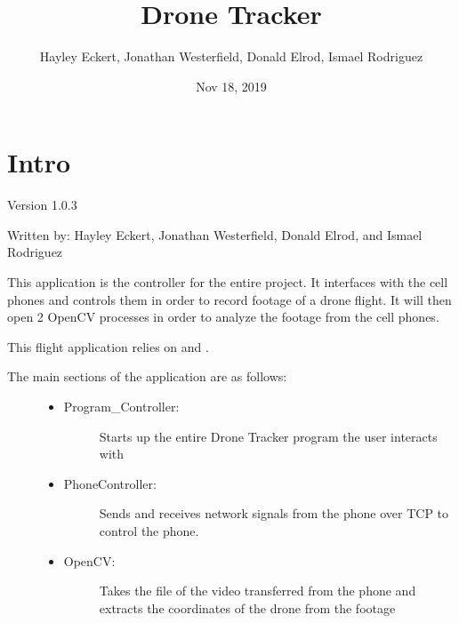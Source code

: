\documentclass[letterpaper,10pt,english]{sphinxmanual}
\title{Drone Tracker}
\date{Nov 18, 2019}
\author{Hayley Eckert, Jonathan Westerfield, Donald Elrod, Ismael Rodriguez}
\begin{document}
\pagestyle{empty}
\sphinxmaketitle
\pagestyle{plain}
\sphinxtableofcontents
\pagestyle{normal}
\label{\detokenize{index::doc}}



\chapter{Intro}
\label{\detokenize{index:intro}}
Version 1.0.3

Written by: Hayley Eckert, Jonathan Westerfield, Donald Elrod, and Ismael Rodriguez

This application is the controller for the entire project. It interfaces with the cell phones and controls them in order to record footage of a drone flight. It will then open 2 OpenCV processes in order to analyze the footage from the cell phones.

This flight application relies on  and .
\begin{description}
\item[{The main sections of the application are as follows:}] \leavevmode\begin{itemize}
\item {} \begin{description}
\item[{Program\_Controller:}] \leavevmode
Starts up the entire Drone Tracker program the user interacts with

\end{description}

\item {} \begin{description}
\item[{PhoneController:}] \leavevmode
Sends and receives network signals from the phone over TCP to control the phone.

\end{description}

\item {} \begin{description}
\item[{OpenCV:}] \leavevmode
Takes the file of the video transferred from the phone and extracts the coordinates of the drone from the footage

\end{description}

\end{itemize}

\end{description}
\end{document}
